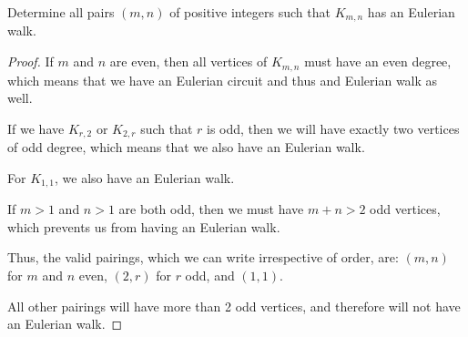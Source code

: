 \documentclass[../hw6]{subfiles}
\begin{document}
\begin{problem}
Determine all pairs $(m,n)$ of positive integers such that $K_{m,n}$ has an Eulerian walk.
\end{problem}
\begin{proof}
	If $m$ and  $n$ are even, then all vertices of  $K_{m,n}$ must have an even degree, which means that we have an Eulerian circuit and thus and Eulerian walk as well.

	If we have $K_{r,2}$ or $K_{2,r}$ such that $r$ is odd, then we will have exactly two vertices of odd degree, which means that we also have an Eulerian walk.

	For $K_{1,1}$, we also have an Eulerian walk.

	If $m>1$ and  $n>1$ are both odd, then we must have  $m+n>2$ odd vertices, which prevents us from having an Eulerian walk.

	Thus, the valid pairings, which we can write irrespective of order, are:
	$(m,n)$ for $m$ and $n$ even, $(2,r)$ for $r$ odd, and $(1,1)$.

	All other pairings will have more than 2 odd vertices, and therefore will not have an Eulerian walk.
\end{proof}
\end{document}
